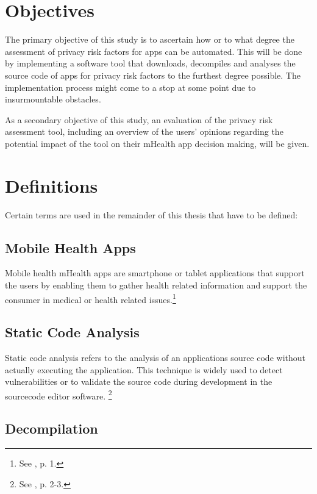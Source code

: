\documentclass[
	a4paper,
	oneside,
	12pt,
	liststotocnumbered
]{article}
\let\cite\textcite
\begin{document}
\section{Objectives}

The primary objective of this study is to ascertain how or to what degree the assessment of privacy risk factors for \mH apps can be automated.
This will be done by implementing a software tool that downloads, decompiles and analyses the source code of \mH apps for privacy risk factors to the furthest degree possible.
The implementation process might come to a stop at some point due to insurmountable obstacles.

As a secondary objective of this study, an evaluation of the privacy risk assessment tool, including an overview of the users’ opinions regarding the potential impact of the tool on their mHealth app decision making, will be given.

\section{Definitions}
Certain terms are used in the remainder of this thesis that have to be defined:

\subsection{Mobile Health Apps}

Mobile health \acs{mHealth} apps are smartphone or tablet applications that support the users by enabling them to gather health related information and support the consumer in medical or health related issues.\footnote{See \cite{Dehling2015b}, p. 1.}

\subsection{Static Code Analysis}

Static code analysis refers to the analysis of an applications source code without actually executing the application. 
This technique is widely used to detect vulnerabilities or to validate the source code during development in the sourcecode editor software. \footnote{See \cite{bardas2010static}, p. 2-3.}

\subsection{Decompilation}
\end{document}

